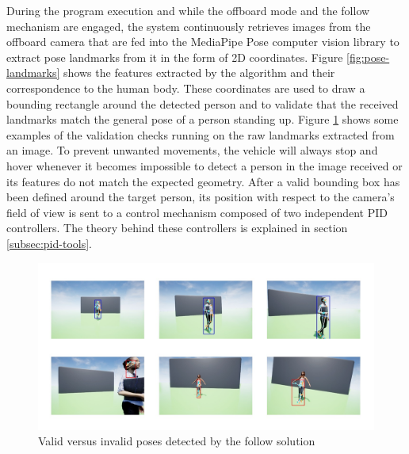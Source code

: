 During the program execution and while the offboard mode and the follow mechanism are engaged, the system continuously retrieves images from the offboard camera that are fed into the MediaPipe Pose \cite{mp-pose-paper} computer vision library to extract pose landmarks from it in the form of 2D coordinates.
Figure \ref{fig:pose-landmarks} shows the features extracted by the algorithm and their correspondence to the human body.
These coordinates are used to draw a bounding rectangle around the detected person and to validate that the received landmarks match the general pose of a person standing up.
Figure \ref{fig:pose-validation} shows some examples of the validation checks running on the raw landmarks extracted from an image.
To prevent unwanted movements, the vehicle will always stop and hover whenever it becomes impossible to detect a person in the image received or its features do not match the expected geometry.
After a valid bounding box has been defined around the target person, its position with respect to the camera's field of view is sent to a control mechanism composed of two independent PID controllers. The theory behind these controllers is explained in section \ref{subsec:pid-tools}.

\begin{figure}
  \centering
  \includegraphics[width=\textwidth, keepaspectratio]{img/pose-validation.jpg}
  \caption{Valid versus invalid poses detected by the follow solution}
  \label{fig:pose-validation}
\end{figure}

